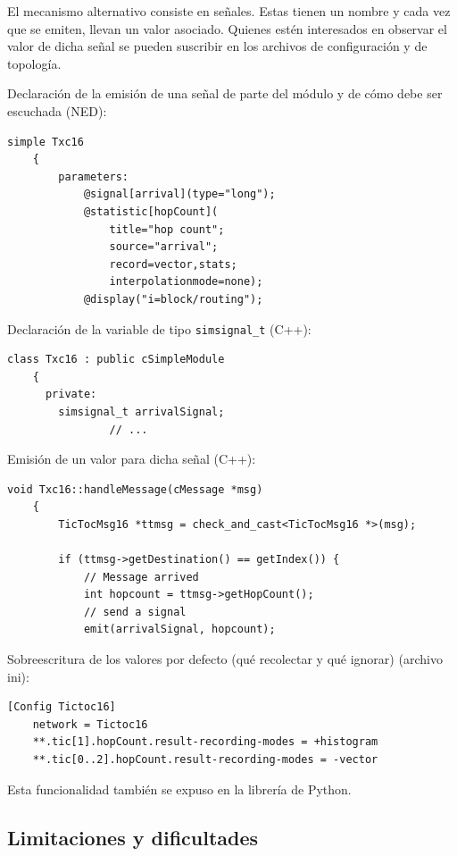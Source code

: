 \documentclass[]{article}
\begin{document}
El mecanismo alternativo consiste en señales. Estas tienen un nombre y cada vez
que se emiten, llevan un valor asociado. Quienes estén interesados en observar
el valor de dicha señal se pueden suscribir en los archivos de configuración y
de topología.

Declaración de la emisión de una señal de parte del módulo y de cómo debe ser
escuchada (NED):

\begin{verbatim}
simple Txc16
    {
        parameters:
            @signal[arrival](type="long");
            @statistic[hopCount](
                title="hop count";
                source="arrival";
                record=vector,stats;
                interpolationmode=none);
            @display("i=block/routing");
\end{verbatim}

Declaración de la variable de tipo \verb!simsignal_t! (C++):

\begin{verbatim}
class Txc16 : public cSimpleModule
    {
      private:
        simsignal_t arrivalSignal;
                // ...
\end{verbatim}

Emisión de un valor para dicha señal (C++):

\begin{verbatim}
void Txc16::handleMessage(cMessage *msg)
    {
        TicTocMsg16 *ttmsg = check_and_cast<TicTocMsg16 *>(msg);
    
        if (ttmsg->getDestination() == getIndex()) {
            // Message arrived
            int hopcount = ttmsg->getHopCount();
            // send a signal
            emit(arrivalSignal, hopcount);
\end{verbatim}

Sobreescritura de los valores por defecto (qué recolectar y qué ignorar)
(archivo ini):

\begin{verbatim}
[Config Tictoc16]
    network = Tictoc16
    **.tic[1].hopCount.result-recording-modes = +histogram
    **.tic[0..2].hopCount.result-recording-modes = -vector
\end{verbatim}

Esta funcionalidad también se expuso en la librería de Python.

\subsection{Limitaciones y dificultades}\label{subsec:lim}
\end{document}
